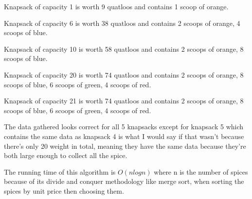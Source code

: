 \documentclass[12pt,letterpaper, onecolumn]{exam}
\begin{document}
\vspace{.2cm}

\noindent Knapsack of capacity 1 is worth 9 quatloos and contains 1 scoop of orange.

\vspace{.1cm}

Knapsack of capacity 6 is worth 38 quatloos and contains 2 scoops of orange, 4 scoops of blue.

\vspace{.1cm}

Knapsack of capacity 10 is worth 58 quatloos and contains 2 scoops of orange, 8 scoops of blue.

\vspace{.1cm}

Knapsack of capacity 20 is worth 74 quatloos and contains 2 scoops of orange, 8 scoops of blue, 6 scoops of green, 4 scoops of red.

\vspace{.1cm}

Knapsack of capacity 21 is worth 74 quatloos and contains 2 scoops of orange, 8 scoops of blue, 6 scoops of green, 4 scoops of red.

\vspace{.2cm}

\centering The data gathered looks correct for all 5 knapsacks except for knapsack 5 which contains the same data as knapsack 4 is what I would say if that wasn't because there's only 20 weight in total, meaning they have the same data because they're both large enough to collect all the spice. 

\vspace{.2cm}

\centering The running time of this algorithm is \(O(n log n)\) where n is the number of spices because of its divide and conquer methodology like merge sort, when sorting the spices by unit price then choosing them. 
\end{document}
